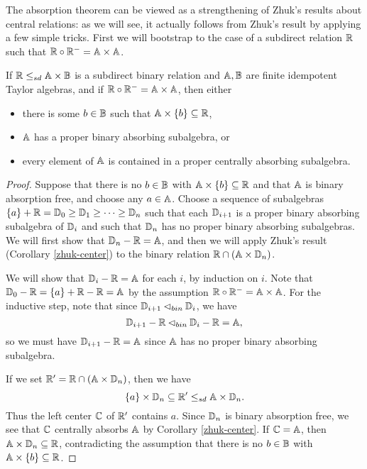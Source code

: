 \documentclass[letterpaper,11pt]{article}
\begin{document}
The absorption theorem can be viewed as a strengthening of Zhuk's results about central relations: as we will see, it actually follows from Zhuk's result by applying a few simple tricks. First we will bootstrap to the case of a subdirect relation $\mathbb{R}$ such that $\mathbb{R} \circ \mathbb{R}^- = \mathbb{A}\times \mathbb{A}$.

\begin{lem} If $\mathbb{R} \le_{sd} \mathbb{A} \times \mathbb{B}$ is a subdirect binary relation and $\mathbb{A},\mathbb{B}$ are finite idempotent Taylor algebras, and if $\mathbb{R} \circ \mathbb{R}^- = \mathbb{A} \times \mathbb{A}$, then either
\begin{itemize}
\item there is some $b \in \mathbb{B}$ such that $\mathbb{A} \times \{b\} \subseteq \mathbb{R}$,
\item $\mathbb{A}$ has a proper binary absorbing subalgebra, or
\item every element of $\mathbb{A}$ is contained in a proper centrally absorbing subalgebra.
\end{itemize}
\end{lem}
\begin{proof} Suppose that there is no $b \in \mathbb{B}$ with $\mathbb{A} \times \{b\} \subseteq \mathbb{R}$ and that $\mathbb{A}$ is binary absorption free, and choose any $a \in \mathbb{A}$. Choose a sequence of subalgebras $\{a\} + \mathbb{R} = \mathbb{D}_0 \ge \mathbb{D}_1 \ge \cdots \ge \mathbb{D}_n$ such that each $\mathbb{D}_{i+1}$ is a proper binary absorbing subalgebra of $\mathbb{D}_i$ and such that $\mathbb{D}_n$ has no proper binary absorbing subalgebras. We will first show that $\mathbb{D}_n - \mathbb{R} = \mathbb{A}$, and then we will apply Zhuk's result (Corollary \ref{zhuk-center}) to the binary relation $\mathbb{R} \cap (\mathbb{A} \times \mathbb{D}_n)$.

We will show that $\mathbb{D}_i - \mathbb{R} = \mathbb{A}$ for each $i$, by induction on $i$. Note that $\mathbb{D}_0 - \mathbb{R} = \{a\} + \mathbb{R} - \mathbb{R} = \mathbb{A}$ by the assumption $\mathbb{R}\circ \mathbb{R}^- = \mathbb{A}\times \mathbb{A}$. For the inductive step, note that since $\mathbb{D}_{i+1} \lhd_{bin} \mathbb{D}_i$, we have
\[
\mathbb{D}_{i+1} - \mathbb{R} \lhd_{bin} \mathbb{D}_i - \mathbb{R} = \mathbb{A},
\]
so we must have $\mathbb{D}_{i+1} - \mathbb{R} = \mathbb{A}$ since $\mathbb{A}$ has no proper binary absorbing subalgebra.

If we set $\mathbb{R}' = \mathbb{R} \cap (\mathbb{A} \times \mathbb{D}_n)$, then we have
\[
\{a\} \times \mathbb{D}_n \subseteq \mathbb{R}' \le_{sd} \mathbb{A} \times \mathbb{D}_n.
\]
Thus the left center $\mathbb{C}$ of $\mathbb{R}'$ contains $a$. Since $\mathbb{D}_n$ is binary absorption free, we see that $\mathbb{C}$ centrally absorbs $\mathbb{A}$ by Corollary \ref{zhuk-center}. If $\mathbb{C} = \mathbb{A}$, then $\mathbb{A}\times\mathbb{D}_n \subseteq\mathbb{R}$, contradicting the assumption that there is no $b \in \mathbb{B}$ with $\mathbb{A} \times \{b\} \subseteq \mathbb{R}$.
\end{proof}
\end{document}
